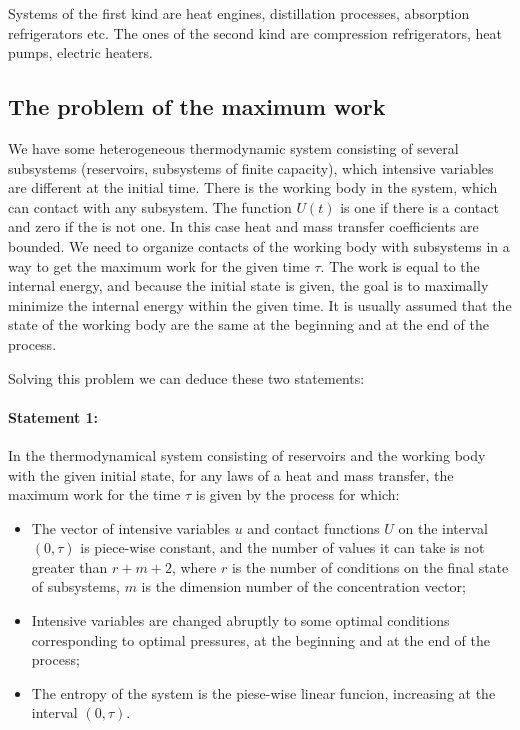 \documentclass[epjST]{svjour}
\begin{document}
Systems of the first kind are heat engines, distillation processes, absorption refrigerators etc. The ones of the second kind are compression refrigerators, heat pumps, electric heaters.

\subsection*{The problem of the maximum work}

We have some heterogeneous thermodynamic system consisting of several subsystems (reservoirs, subsystems of finite capacity), which intensive variables are different at the initial time. There is the working body in the system, which can contact with any subsystem. The function $U(t)$ is one if there is a contact and zero if the is not one. In this case heat and mass transfer coefficients are bounded. We need to organize contacts of the working body with subsystems in a way to get the maximum work for the given time $\tau$. The work is equal to the internal energy, and because the initial state is given, the goal is to maximally minimize the internal energy within the given time. It is usually assumed that the state of the working body are the same at the beginning and at the end of the process.

Solving this problem we can deduce these two statements\cite{Ts2}:

\paragraph{Statement 1:} In the thermodynamical system consisting of reservoirs and the working body with the given initial state, for any laws of a heat and mass transfer, the maximum work for the time $\tau$ is given by the process for which:

\begin{itemize}
\item The vector of intensive variables $u$ and contact functions $U$ on the interval $(0, \tau)$ is piece-wise constant, and the number of values it can take is not greater than $r+m+2$, where $r$ is the number of conditions on the final state of subsystems, $m$ is the dimension number of the concentration vector;
\item Intensive variables are changed abruptly to some optimal conditions corresponding to optimal pressures, at the beginning and at the end of the process;
\item The entropy of the system is the piese-wise linear funcion, increasing at the interval $(0, \tau)$.
\end{itemize}
\end{document}
